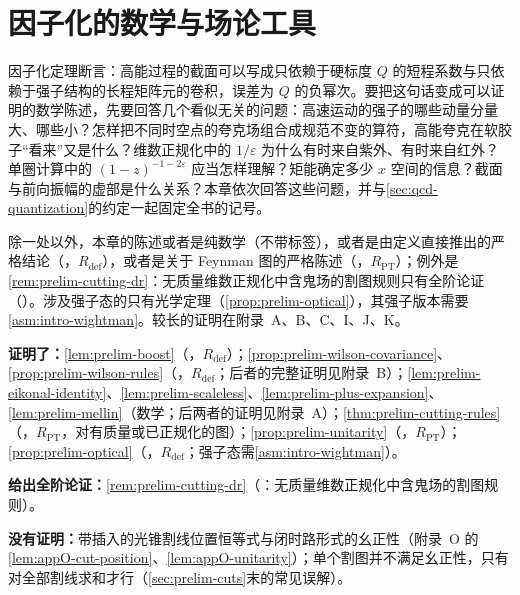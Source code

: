 \chapter{因子化的数学与场论工具}\label{ch:prelim}

因子化定理断言：高能过程的截面可以写成只依赖于硬标度 $Q$ 的短程系数与只依赖于强子结构的长程矩阵元的卷积，误差为 $Q$ 的负幂次。要把这句话变成可以证明的数学陈述，先要回答几个看似无关的问题：高速运动的强子的哪些动量分量大、哪些小？怎样把不同时空点的夸克场组合成规范不变的算符，高能夸克在软胶子“看来”又是什么？维数正规化中的 $1/\varepsilon$ 为什么有时来自紫外、有时来自红外？单圈计算中的 $(1-z)^{-1-2\varepsilon}$ 应当怎样理解？矩能确定多少 $x$ 空间的信息？截面与前向振幅的虚部是什么关系？本章依次回答这些问题，并与\cref{sec:qcd-quantization}的约定一起固定全书的记号。

除一处以外，本章的陈述或者是纯数学（不带标签），或者是由定义直接推出的严格结论（\tagR，$R_{\mathrm{def}}$），或者是关于 Feynman 图的严格陈述（\tagR，$R_{\mathrm{PT}}$）；例外是\cref{rem:prelim-cutting-dr}：无质量维数正规化中含鬼场的割图规则只有全阶论证（\tagA）。涉及强子态的只有光学定理（\cref{prop:prelim-optical}），其强子版本需要\cref{asm:intro-wightman}。较长的证明在附录~A、B、C、I、J、K。

\begin{tcolorbox}[enhanced,breakable,title=本章证明了什么／没有证明什么,fonttitle=\bfseries,
  colback=gray!3!white,colframe=gray!55!black,boxrule=0.6pt,arc=2pt,
  left=5pt,right=5pt,top=3pt,bottom=3pt,before skip=6pt,after skip=6pt]
\textbf{证明了：}\cref{lem:prelim-boost}（\tagR，$R_{\mathrm{def}}$）；\cref{prop:prelim-wilson-covariance}、\cref{prop:prelim-wilson-rules}（\tagR，$R_{\mathrm{def}}$；后者的完整证明见附录~B）；\cref{lem:prelim-eikonal-identity}、\cref{lem:prelim-scaleless}、\cref{lem:prelim-plus-expansion}、\cref{lem:prelim-mellin}（数学；后两者的证明见附录~A）；\cref{thm:prelim-cutting-rules}（\tagR，$R_{\mathrm{PT}}$，对有质量或已正规化的图）；\cref{prop:prelim-unitarity}（\tagR，$R_{\mathrm{PT}}$）；\cref{prop:prelim-optical}（\tagR，$R_{\mathrm{def}}$；强子态需\cref{asm:intro-wightman}）。\par
\textbf{给出全阶论证：}\cref{rem:prelim-cutting-dr}（\tagA：无质量维数正规化中含鬼场的割图规则）。\par
\textbf{没有证明：}带插入的光锥割线位置恒等式与闭时路形式的幺正性（附录~O 的\cref{lem:appO-cut-position}、\cref{lem:appO-unitarity}）；单个割图并不满足幺正性，只有对全部割线求和才行（\cref{sec:prelim-cuts}末的常见误解）。
\end{tcolorbox}

